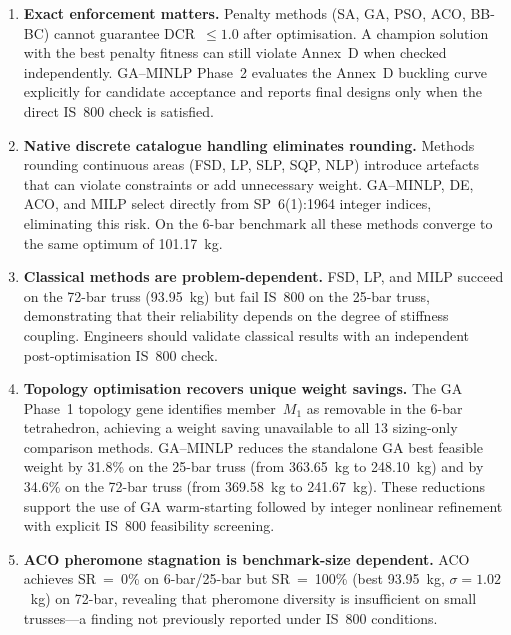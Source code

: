 \documentclass[lineno,pdflatex,sn-mathphys-num]{sn-jnl}
\begin{document}
\begin{enumerate}
  \item \textbf{Exact enforcement matters.}
        Penalty methods (SA, GA, PSO, ACO, BB-BC) cannot guarantee
        DCR~$\leq 1.0$ after optimisation.
        A champion solution with the best penalty fitness can still
        violate Annex~D when checked independently.
        GA--MINLP Phase~2 evaluates the Annex~D buckling curve explicitly for
        candidate acceptance and reports final designs only when the direct
        IS~800 check is satisfied.

  \item \textbf{Native discrete catalogue handling eliminates rounding.}
        Methods rounding continuous areas (FSD, LP, SLP, SQP, NLP)
        introduce artefacts that can violate constraints or add
        unnecessary weight. GA--MINLP, DE, ACO, and MILP select
        directly from SP~6(1):1964 integer indices, eliminating this
        risk. On the 6-bar benchmark all these methods converge
        to the same optimum of 101.17~kg.

  \item \textbf{Classical methods are problem-dependent.}
        FSD, LP, and MILP succeed on the 72-bar truss (93.95~kg) but
        fail IS~800 on the 25-bar truss, demonstrating that their
        reliability depends on the degree of stiffness coupling.
        Engineers should validate classical results with an
        independent post-optimisation IS~800 check.

  \item \textbf{Topology optimisation recovers unique weight savings.}
        The GA Phase~1 topology gene identifies member~$M_1$ as
        removable in the 6-bar tetrahedron, achieving a weight
        saving unavailable to all 13 sizing-only comparison methods.
        GA--MINLP reduces the standalone GA best feasible weight by
        31.8\% on the 25-bar truss (from 363.65~kg to 248.10~kg) and
        by 34.6\% on the 72-bar truss (from 369.58~kg to 241.67~kg).
        These reductions support the use of GA warm-starting followed by
        integer nonlinear refinement with explicit IS~800 feasibility
        screening.

  \item \textbf{ACO pheromone stagnation is benchmark-size dependent.}
        ACO achieves SR~=~0\% on 6-bar/25-bar but SR~=~100\%
        (best 93.95~kg, $\sigma=1.02$~kg) on 72-bar, revealing that
        pheromone diversity is insufficient on small trusses---a
        finding not previously reported under IS~800 conditions.
\end{enumerate}
\end{document}

